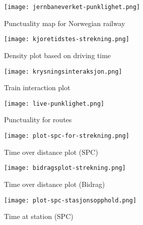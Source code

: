 \begin{figure}[!htbp]
	\texttt{[image: jernbaneverket-punklighet.png]}
	\caption[Punctuality map for Norwegian railway]{Punctuality map for Norwegian railway
	\cite{jernbaneverketPunklighetKart}}
	\label{fig:jernbaneverket-punklighet}
\end{figure}
\pagebreak


\begin{figure}[!htbp]
	\texttt{[image: kjoretidstes-strekning.png]}
	\caption[Density plot based on driving time]{Density plot based on driving time \cite{sintefPresis}}
	\label{fig:kjoretidstes-strekning}
\end{figure}
\pagebreak

\begin{figure}[!htbp]
	\texttt{[image: krysningsinteraksjon.png]}
	\caption[Train interaction plot]{Train interaction plot \cite{sintefPresis}}
	\label{fig:krysningsinteraksjon}
\end{figure}
\pagebreak

\begin{figure}[!htbp]
	\texttt{[image: live-punklighet.png]}
	\caption[Punctuality for routes]{Punctuality for routes \cite{sintefPresis}}
	\label{fig:live-punklighet}
\end{figure}
\pagebreak

\begin{figure}[!htbp]
	\texttt{[image: plot-spc-for-strekning.png]}
	\caption[Time over distance plot (SPC)]{Time over distance plot (SPC) \cite{sintefPresis}}
	\label{fig:plot-spc-for-strekning}
\end{figure}
\pagebreak

\begin{figure}[!htbp]
	\texttt{[image: bidragsplot-strekning.png]}
	\caption[Time over distance plot (Bidrag)]{Time over distance plot (Bidrag) \cite{sintefPresis}}
	\label{fig:bidragsplot-strekning}
\end{figure}
\pagebreak

\begin{figure}[!htbp]
	\texttt{[image: plot-spc-stasjonsopphold.png]}
	\caption[Time at station (SPC)]{Time at station (SPC) \cite{flightAware:MiseryMap}}
	\label{fig:plot-spc-for-stasjonsopphold}
\end{figure}
\pagebreak

